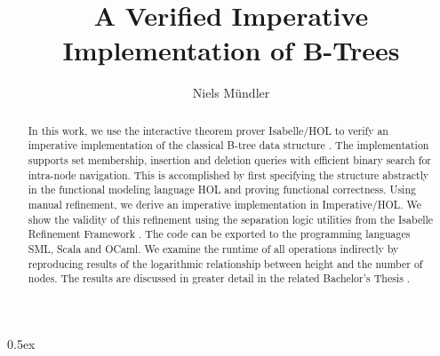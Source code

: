 \documentclass[11pt,a4paper]{article}
\begin{document}
\title{A Verified Imperative Implementation of B-Trees}
\author{Niels Mündler}
\date{}
\maketitle

\begin{abstract}
In this work, we use the interactive theorem prover Isabelle/HOL
to verify an imperative implementation of the classical B-tree data structure \cite{DBLP:journals/acta/BayerM72}.
The implementation supports set membership, insertion and deletion queries
with efficient binary search for intra-node navigation.
This is accomplished by first specifying the structure abstractly 
in the functional modeling language HOL and proving functional correctness.
Using manual refinement, we derive an imperative implementation
in Imperative/HOL.
We show the validity of this refinement using
the separation logic utilities from the
Isabelle Refinement Framework \cite{Refine_Imperative_HOL-AFP}. 
The code can be exported to the programming languages SML, Scala and OCaml.
We examine the runtime of all operations indirectly by reproducing results
of the logarithmic relationship between height and the number of nodes.
The results are discussed in greater detail in the related Bachelor's Thesis
\cite{BTNielsMuendler}.
\end{abstract}

\tableofcontents

\parindent 0pt\parskip 0.5ex



{\raggedright


}
\end{document}
